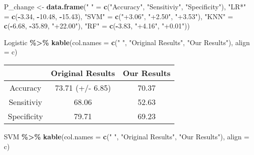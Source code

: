 \documentclass[
]{article}
\newenvironment{Shaded}{\begin{snugshade}}{\end{snugshade}}
\newcommand{\AttributeTok}[1]{\textcolor[rgb]{0.13,0.29,0.53}{#1}}
\newcommand{\FloatTok}[1]{\textcolor[rgb]{0.00,0.00,0.81}{#1}}
\newcommand{\FunctionTok}[1]{\textcolor[rgb]{0.13,0.29,0.53}{\textbf{#1}}}
\newcommand{\NormalTok}[1]{#1}
\newcommand{\OtherTok}[1]{\textcolor[rgb]{0.56,0.35,0.01}{#1}}
\newcommand{\SpecialCharTok}[1]{\textcolor[rgb]{0.81,0.36,0.00}{\textbf{#1}}}
\newcommand{\StringTok}[1]{\textcolor[rgb]{0.31,0.60,0.02}{#1}}
\begin{document}
\begin{Shaded}
\begin{Highlighting}[]
\NormalTok{P\_change }\OtherTok{\textless{}{-}} \FunctionTok{data.frame}\NormalTok{(}\StringTok{" "} \OtherTok{=} \FunctionTok{c}\NormalTok{(}\StringTok{"Accuracy"}\NormalTok{, }\StringTok{"Sensitiviy"}\NormalTok{, }\StringTok{"Specificity"}\NormalTok{), }\StringTok{"LR*"} \OtherTok{=} \FunctionTok{c}\NormalTok{(}\SpecialCharTok{{-}}\FloatTok{3.34}\NormalTok{, }\SpecialCharTok{{-}}\FloatTok{10.48}\NormalTok{, }\SpecialCharTok{{-}}\FloatTok{15.43}\NormalTok{), }\StringTok{"SVM"} \OtherTok{=} \FunctionTok{c}\NormalTok{(}\StringTok{"+3.06"}\NormalTok{, }\StringTok{"+2.50"}\NormalTok{, }\StringTok{"+3.53"}\NormalTok{), }\StringTok{"KNN"} \OtherTok{=} \FunctionTok{c}\NormalTok{(}\SpecialCharTok{{-}}\FloatTok{6.68}\NormalTok{, }\SpecialCharTok{{-}}\FloatTok{35.89}\NormalTok{, }\StringTok{"+22.00"}\NormalTok{), }\StringTok{"RF"} \OtherTok{=} \FunctionTok{c}\NormalTok{(}\SpecialCharTok{{-}}\FloatTok{3.83}\NormalTok{, }\StringTok{"+4.16"}\NormalTok{, }\StringTok{"+0.01"}\NormalTok{))}

\NormalTok{Logistic }\SpecialCharTok{\%\textgreater{}\%}
  \FunctionTok{kable}\NormalTok{(}\AttributeTok{col.names =} \FunctionTok{c}\NormalTok{(}\StringTok{" "}\NormalTok{, }\StringTok{"Original Results"}\NormalTok{, }\StringTok{"Our Results"}\NormalTok{), }\AttributeTok{align =} \StringTok{\textquotesingle{}c\textquotesingle{}}\NormalTok{)}
\end{Highlighting}
\end{Shaded}

\begin{longtable}[]{@{}ccc@{}}
\toprule\noalign{}
& Original Results & Our Results \\
\midrule\noalign{}
\endhead
\bottomrule\noalign{}
\endlastfoot
Accuracy & 73.71 (+/- 6.85) & 70.37 \\
Sensitiviy & 68.06 & 52.63 \\
Specificity & 79.71 & 69.23 \\
\end{longtable}

\begin{Shaded}
\begin{Highlighting}[]
\NormalTok{SVM }\SpecialCharTok{\%\textgreater{}\%}
  \FunctionTok{kable}\NormalTok{(}\AttributeTok{col.names =} \FunctionTok{c}\NormalTok{(}\StringTok{" "}\NormalTok{, }\StringTok{"Original Results"}\NormalTok{, }\StringTok{"Our Results"}\NormalTok{), }\AttributeTok{align =} \StringTok{\textquotesingle{}c\textquotesingle{}}\NormalTok{) }
\end{Highlighting}
\end{Shaded}
\end{document}
